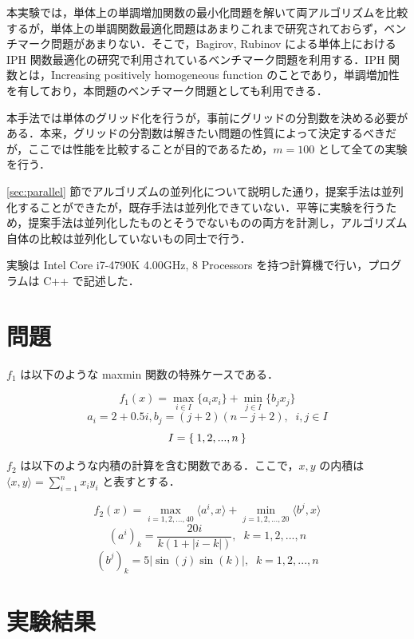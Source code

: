 \documentclass[a4paper,11pt]{jreport}
\begin{document}
本実験では，単体上の単調増加関数の最小化問題を解いて両アルゴリズムを比較するが，単体上の単調関数最適化問題はあまりこれまで研究されておらず，ベンチマーク問題があまりない．そこで，Bagirov, Rubinov \cite{bagirov} による単体上における IPH 関数最適化の研究で利用されているベンチマーク問題を利用する．IPH 関数とは，Increasing positively homogeneous function のことであり，単調増加性を有しており，本問題のベンチマーク問題としても利用できる．\par
本手法では単体のグリッド化を行うが，事前にグリッドの分割数を決める必要がある．本来，グリッドの分割数は解きたい問題の性質によって決定するべきだが，ここでは性能を比較することが目的であるため，$ m = 100 $ として全ての実験を行う．\par
\ref{sec:parallel} 節でアルゴリズムの並列化について説明した通り，提案手法は並列化することができたが，既存手法は並列化できていない．平等に実験を行うため，提案手法は並列化したものとそうでないものの両方を計測し，アルゴリズム自体の比較は並列化していないもの同士で行う．\par
実験は Intel Core i7-4790K 4.00GHz, 8 Processors を持つ計算機で行い，プログラムは C++ で記述した．\par

\section{問題}

$ f_1 $ は以下のような maxmin 関数の特殊ケースである．\par

$$ f_1(x) = \max_{i \in I} \{a_i x_i \} + \min_{j \in I} \{b_j x_j \} $$
$$ a_i = 2 + 0.5 i, b_j = (j + 2) (n - j + 2), \;\; i, j \in I $$
$$ I = \Set{1, 2, ..., n} $$

$ f_2 $ は以下のような内積の計算を含む関数である．ここで，$ x, y $ の内積は $ \langle x, y \rangle = \sum_{i = 1}^{n} x_i y_i $ と表すとする．\par

$$ f_2(x) = \max_{i = 1, 2, ..., 40} \langle a^i, x \rangle + \min_{j = 1, 2, ..., 20} \langle b^j, x \rangle $$
$$ (a^i)_k = \frac{20i}{k(1 + | i - k |)}, \;\; k = 1, 2, ..., n $$
$$ (b^j)_k = 5 | \sin{(j)} \sin{(k)} |, \;\; k = 1, 2, ..., n $$

\section{実験結果}
\end{document}
